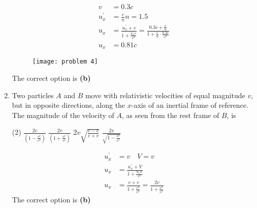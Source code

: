 \begin{enumerate}
\begin{answer}
\begin{minipage}{0.5\textwidth}
\begin{align*}
v&=0.3 c\\
u_{x}^{\prime}&=\frac{c}{n} n=1.5\\
u_{x}&=\frac{u_{x}^{\prime}+v}{1+\frac{u_{x}^{\prime} v}{c^{2}}}=\frac{0.3 c+\frac{c}{n}}{1+\frac{c}{n} \cdot \frac{0.3 c}{c^{2}}}\\
u_{x}&=0.81 c
\end{align*}
	\end{minipage}
\begin{minipage}{0.5\textwidth}
\begin{figure}[H]
	\centering
	\texttt{[image: problem 4]}
\end{figure}
\end{minipage}
The correct option is \textbf{(b)}
\end{answer}
	\item Two particles $A$ and $B$ move with relativistic velocities of equal magnitude $v$, but in opposite directions, along the $x$-axis of an inertial frame of reference. The magnitude of the velocity of $A$, as seen from the rest frame of $B$, is
	{}

\begin{tasks}(2)
	\task[\textbf{A.}] $\frac{2 v}{\left(1-\frac{v^{2}}{c^{2}}\right)}$ 
	\task[\textbf{B.}]$\frac{2 v}{\left(1+\frac{v^{2}}{c^{2}}\right)}$
	\task[\textbf{C.}] $2 v \sqrt{\frac{c-v}{c+v}}$ 
	\task[\textbf{D.}]$\frac{2 v}{\sqrt{1-\frac{v^{2}}{c^{2}}}}$
\end{tasks}
\begin{answer}
	\begin{align*}
	u_{x}^{\prime}&=v \quad V=v\\
	u_{x}&=\frac{u_{x}^{\prime}+V}{1+\frac{u_{x} V}{c^{2}}}\\
	u_{x}&=\frac{v+v}{1+\frac{v^{2}}{c^{2}}}=\frac{2 v}{1+\frac{v^{2}}{c^{2}}}
	\end{align*}
	The correct option is \textbf{(b)}
\end{answer}


\end{enumerate}
